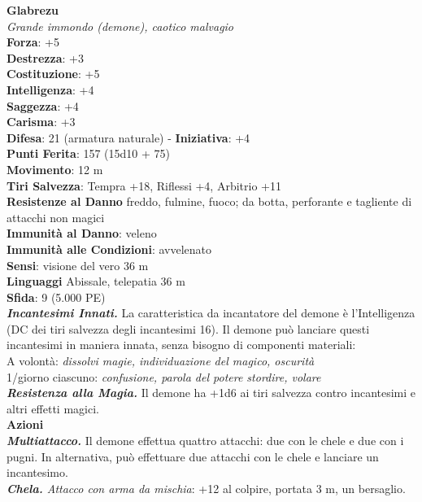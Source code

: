 \begin{multicols}{2}
\medskip\textbf{Glabrezu}\\
\emph{Grande immondo (demone), caotico malvagio}\\
\textbf{Forza}: +5\\
\textbf{Destrezza}: +3\\
\textbf{Costituzione}: +5\\
\textbf{Intelligenza}: +4\\
\textbf{Saggezza}: +4\\
\textbf{Carisma}: +3\\
\textbf{Difesa}: 21 (armatura naturale) - \textbf{Iniziativa}: +4\\
\textbf{Punti Ferita}: 157 (15d10 + 75)\\
\textbf{Movimento}: 12 m\\
\textbf{Tiri Salvezza}: Tempra +18, Riflessi +4, Arbitrio +11\\
\textbf{Resistenze al Danno} freddo, fulmine, fuoco; da botta, perforante e tagliente di attacchi non magici\\
\textbf{Immunità al Danno}: veleno\\
\textbf{Immunità alle Condizioni}: avvelenato\\
\textbf{Sensi}: visione del vero 36 m\\
\textbf{Linguaggi} Abissale, telepatia 36 m \\
\textbf{Sfida}: 9 (5.000 PE)\smallskip\\
\emph{\textbf{Incantesimi Innati.}} La caratteristica da incantatore del demone è l'Intelligenza (DC dei tiri salvezza degli incantesimi 16). Il demone può lanciare questi incantesimi in maniera innata, senza bisogno di componenti materiali:\\
A volontà: \emph{dissolvi magie, individuazione del magico, oscurità}\\
1/giorno ciascuno: \emph{confusione, parola del potere stordire, volare}\\
\emph{\textbf{Resistenza alla Magia.}} Il demone ha +1d6 ai tiri salvezza contro  incantesimi e altri effetti magici. \\
\smallskip\textbf{Azioni}\\
\emph{\textbf{Multiattacco.}} Il demone effettua quattro attacchi: due con le chele e due con i pugni. In alternativa, può effettuare due attacchi con le chele e lanciare un incantesimo.\\
\emph{\textbf{Chela.} Attacco con arma da mischia}: +12 al colpire, portata 3 m, un bersaglio.\\

\end{multicols}
